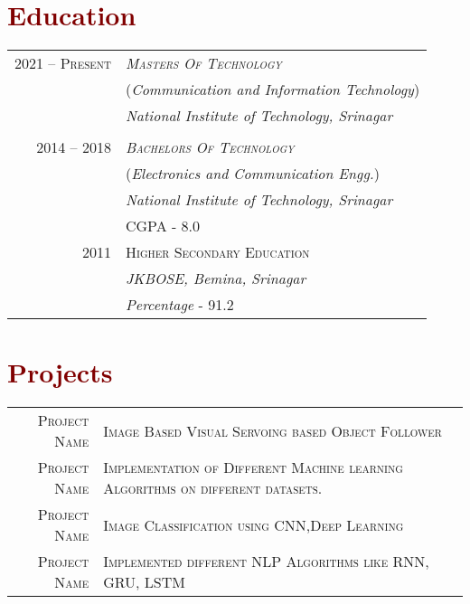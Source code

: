 \documentclass[a4paper,11pt]{article}
\begin{document}
\section{\textcolor{Maroon}{Education}}
\vspace{2mm}
\begin{tabular}{r|p{13cm}}	
\textsc{2021 -- Present} & \emph{{\Large{\textsc{Masters Of Technology}}}}\\ & {  \large (\emph{Communication and Information Technology})}\\
&\emph{National Institute of Technology, Srinagar} \\ 
\vspace{3mm}
\\
\textsc{2014 -- 2018} & \emph{{\Large{\textsc{Bachelors Of Technology}}}}\\ & {  \large (\emph{Electronics and Communication Engg.})}\\
&\emph{National Institute of Technology, Srinagar} \\ & CGPA - 8.0\vspace{3mm}
\\

 \textsc{2011} & {{\Large{\textsc{Higher Secondary Education}}}}\\ 
& \emph{JKBOSE, Bemina, Srinagar}\\ & \emph{Percentage} - 91.2
\end{tabular}
\newpage
\section{\textcolor{Maroon}{Projects}}
\vspace{3mm}
\begin{tabular}{r|p{13cm}}
\textsc{Project Name} & {\normalsize{\textsc{Image Based Visual Servoing based Object Follower}}}
\\
\textsc{Project Name} & {\normalsize{\textsc{Implementation of Different Machine learning Algorithms on different datasets.}}}
\\
\textsc{Project Name} &{\normalsize{\textsc{Image Classification using CNN,Deep Learning }}}\\
\textsc{Project Name} &{\normalsize{\textsc{Implemented different NLP Algorithms like RNN, GRU, LSTM }}}\\
\end{tabular}
\end{document}
